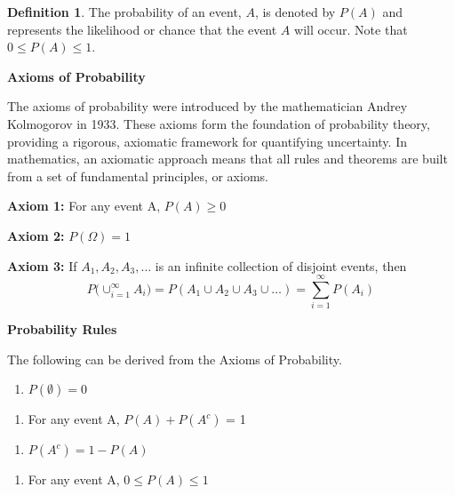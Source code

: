 \documentclass[
  11pt,
  oneside]{book}
\providecommand{\tightlist}{%
  \setlength{\itemsep}{0pt}\setlength{\parskip}{0pt}}
\theoremstyle{definition}
\newtheorem{definition}{Definition}[chapter]
\theoremstyle{definition}
\theoremstyle{definition}
\theoremstyle{definition}
\theoremstyle{remark}
\begin{document}
\begin{definition}
The probability of an event, \(A\), is denoted by \(P(A)\) and represents the likelihood or chance that the event \(A\) will occur. Note that \(0 \leq P(A) \leq 1\).
\end{definition}

\textbf{Axioms of Probability}

The axioms of probability were introduced by the mathematician Andrey Kolmogorov in 1933. These axioms form the foundation of probability theory, providing a rigorous, axiomatic framework for quantifying uncertainty. In mathematics, an axiomatic approach means that all rules and theorems are built from a set of fundamental principles, or axioms.

\textbf{Axiom 1:} For any event A, \(P(A) \ge 0\)

\textbf{Axiom 2:} \(P(\Omega) = 1\)

\textbf{Axiom 3:} If \(A_1, A_2, A_3, \dots\) is an infinite collection of disjoint events, then
\[P \big( \cup_{i=1}^{\infty} A_i \big) = P(A_1 \cup A_2 \cup A_3 \cup \dots) = \sum_{i=1}^{\infty} P(A_i)\]

\textbf{Probability Rules}

The following can be derived from the Axioms of Probability.

\vfill

\begin{enumerate}
\def\labelenumi{\arabic{enumi}.}
\tightlist
\item
  \(P(\emptyset) = 0\)
\end{enumerate}

\vfill

\begin{enumerate}
\def\labelenumi{\arabic{enumi}.}
\setcounter{enumi}{1}
\tightlist
\item
  For any event A, \(P(A) + P(A^c)\) = 1
\end{enumerate}

\vfill

\begin{enumerate}
\def\labelenumi{\arabic{enumi}.}
\setcounter{enumi}{2}
\tightlist
\item
  \(P(A^c) = 1 - P(A)\)
\end{enumerate}

\vfill

\begin{enumerate}
\def\labelenumi{\arabic{enumi}.}
\setcounter{enumi}{3}
\tightlist
\item
  For any event A, \(0 \le P(A) \le 1\)
\end{enumerate}
\end{document}
